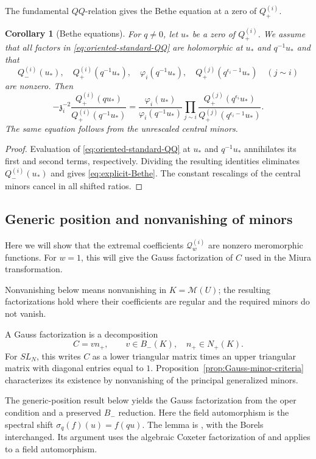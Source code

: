 \documentclass[11pt,leqno]{amsart}
\numberwithin{equation}{section}
\theoremstyle{plain}
\newtheorem{corollary}[theorem]{Corollary}
\theoremstyle{definition}
\theoremstyle{plain}
\theoremstyle{definition}
\theoremstyle{remark}
\begin{document}
The fundamental $QQ$-relation gives the Bethe equation at a zero of $Q_+^{(i)}$.
\begin{corollary}[Bethe equations]\label{cor:Bethe-equations}
For $q\ne0$, let $u_*$ be a zero of $Q_+^{(i)}$.  We assume that all factors in
\eqref{eq:oriented-standard-QQ} are holomorphic at $u_*$ and $q^{-1}u_*$ and that
\[
 Q_-^{(i)}(u_*),\quad Q_+^{(i)}(q^{-1}u_*),\quad
 \varphi_i(q^{-1}u_*),\quad
 Q_+^{(j)}(q^{\epsilon_i-1}u_*)\quad(j\sim i)
\]
are nonzero.  Then
\begin{equation}\label{eq:explicit-Bethe}
 -\mathfrak z_i^{-2}
 \frac{Q_+^{(i)}(qu_*)}{Q_+^{(i)}(q^{-1}u_*)}
 =\frac{\varphi_i(u_*)}{\varphi_i(q^{-1}u_*)}
   \prod_{j\sim i}
   \frac{Q_+^{(j)}(q^{\epsilon_i}u_*)}
        {Q_+^{(j)}(q^{\epsilon_i-1}u_*)}.
\end{equation}
The same equation follows from the unrescaled central minors.
\end{corollary}
\begin{proof}
Evaluation of \eqref{eq:oriented-standard-QQ} at $u_*$ and $q^{-1}u_*$
annihilates its first and second terms, respectively.  Dividing the resulting
identities eliminates $Q_-^{(i)}(u_*)$ and gives \eqref{eq:explicit-Bethe}.
The constant rescalings of the central minors cancel in all shifted ratios.
\end{proof}

\subsection{Generic position and nonvanishing of minors}
Here we will show that the extremal coefficients $\mathcal Q_w^{(i)}$ are nonzero meromorphic functions. For $w=1$, this will give the Gauss factorization of $C$ used in the Miura transformation.

Nonvanishing below means nonvanishing in $K=\mathcal M(U)$; the resulting factorizations hold where their coefficients are regular and the required minors do not vanish.

A Gauss factorization is a decomposition
\[
 C=vn_+,\qquad v\in B_-(K),\quad n_+\in N_+(K).
\]
For $SL_N$, this writes $C$ as a lower triangular matrix times an upper triangular matrix with diagonal entries equal to $1$.  Proposition~\ref{prop:Gauss-minor-criteria} characterizes its existence by nonvanishing of the principal generalized minors.

The generic-position result below yields the Gauss factorization from the oper condition and a preserved $B_-$ reduction. Here the field automorphism is the spectral shift $\sigma_q(f)(u)=f(qu)$.  The lemma is \cite[Theorem~2.3]{FKSZ2020}, with the Borels interchanged.  Its argument uses the algebraic Coxeter factorization of \cite[Theorem~2.5]{FKSZ2020} and applies to a field automorphism.
\end{document}
